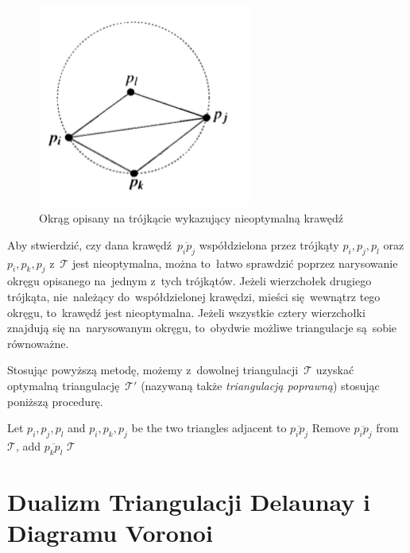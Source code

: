 \documentclass[skorowidz,autorrok,backref,xodstep,oswiadczenie]{wmimgr}
\begin{document}
\begin{figure}[ht!]
\centering
\includegraphics[width=70mm]{images/triangulacja3.png}
\caption{Okrąg opisany na trójkącie wykazujący nieoptymalną krawędź}
\label{edgetest}
\end{figure}

Aby stwierdzić, czy dana krawędź~$\overline{p_{i} p_{j}}$ współdzielona przez trójkąty $p_{i}, p_{j}, p_{l}$ oraz $p_{i}, p_{k}, p_{j}$ z~$\mathcal{T}$ jest nieoptymalna, można to~łatwo sprawdzić poprzez narysowanie okręgu opisanego na~jednym z~tych trójkątów. Jeżeli wierzchołek drugiego trójkąta, nie~należący do~współdzielonej krawędzi, mieści się~wewnątrz tego okręgu, to~krawędź jest nieoptymalna. Jeżeli wszystkie cztery wierzchołki znajdują się na~narysowanym okręgu, to~obydwie możliwe triangulacje są~sobie równoważne.

Stosując powyższą metodę, możemy z~dowolnej triangulacji~$\mathcal{T}$ uzyskać optymalną triangulację~$\mathcal{T'}$ (nazywaną także \emph{triangulacją poprawną}) stosując poniższą procedurę.

\begin{algorithm}
\caption{$LegalTriangulation(\mathcal{T})$ \cite{geometria}}
\label{LegalTriangulation}
\begin{algorithmic}
        \STATE Let $p_{i}, p_{j}, p_{l}$ and $p_{i}, p_{k}, p_{j}$ be the two triangles adjacent to $\overline{p_{i} p_{j}}$
        \STATE Remove $\overline{p_{i} p_{j}}$ from $\mathcal{T}$, add $\overline{p_{k} p_{l}}$
    \ENDWHILE
    \RETURN $\mathcal{T}$
\end{algorithmic}
\end{algorithm}

\section{Dualizm Triangulacji Delaunay i Diagramu Voronoi}
\end{document}
